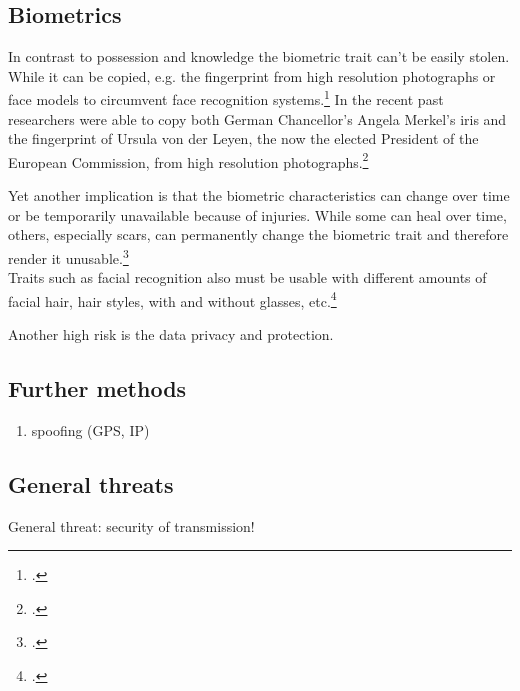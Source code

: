 \subsection{Biometrics}

In contrast to possession and knowledge the biometric trait can't be easily stolen. While it can be copied, e.g. the fingerprint from high resolution photographs or 
face models to circumvent face recognition systems.\footcites[][]{185181}[][]{220566} In the recent past researchers were able to copy both German Chancellor's Angela Merkel's iris and the fingerprint of Ursula von der Leyen, the now the elected President of the European Commission, from high resolution photographs.\footcite{ccc-merkel}

Yet another implication is that the biometric characteristics can change over time or be temporarily unavailable because of injuries. While some can heal over time, others, especially scars, can permanently change the biometric trait and therefore render it unusable.\footcite[See][52]{Jain2011}\\
Traits such as facial recognition also must be usable with different amounts of facial hair, hair styles, with and without glasses, etc.\footcite[See][98]{Jain2011}

Another high risk is the data privacy and protection.

\subsection{Further methods}


\begin{enumerate}
	\item spoofing (GPS, IP)
\end{enumerate}

\subsection{General threats}

General threat: security of transmission!
